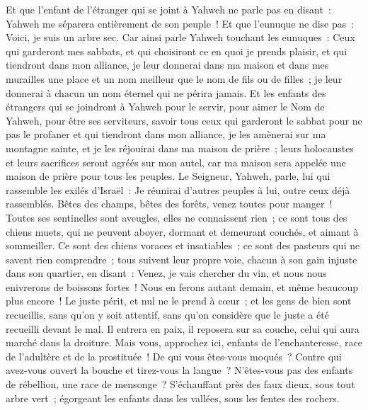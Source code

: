 \begin{multicols}{2}
Et que l'enfant de l'étranger qui se joint à Yahweh ne parle pas en disant~: Yahweh me séparera entièrement de son peuple~! Et que l'eunuque ne dise pas~: Voici, je suis un arbre sec.
Car ainsi parle Yahweh touchant les eunuques~: Ceux qui garderont mes sabbats, et qui choisiront ce en quoi je prends plaisir, et qui tiendront dans mon alliance,
je leur donnerai dans ma maison et dans mes murailles une place et un nom meilleur que le nom de fils ou de filles~; je leur donnerai à chacun un nom éternel qui ne périra jamais.
Et les enfants des étrangers qui se joindront à Yahweh pour le servir, pour aimer le Nom de Yahweh, pour être ses serviteurs, savoir tous ceux qui garderont le sabbat pour ne pas le profaner et qui tiendront dans mon alliance,
je les amènerai sur ma montagne sainte, et je les réjouirai dans ma maison de prière~; leurs holocaustes et leurs sacrifices seront agréés sur mon autel, car ma maison sera appelée une maison de prière pour tous les peuples.
Le Seigneur, Yahweh, parle, lui qui rassemble les exilés d'Israël~: Je réunirai d'autres peuples à lui, outre ceux déjà rassemblés.
Bêtes des champs, bêtes des forêts, venez toutes pour manger~!
Toutes ses sentinelles sont aveugles, elles ne connaissent rien~; ce sont tous des chiens muets, qui ne peuvent aboyer, dormant et demeurant couchés, et aimant à sommeiller.
Ce sont des chiens voraces et insatiables~; ce sont des pasteurs qui ne savent rien comprendre~; tous suivent leur propre voie, chacun à son gain injuste dans son quartier, en disant~:
Venez, je vais chercher du vin, et nous nous enivrerons de boissons fortes~! Nous en ferons autant demain, et même beaucoup plus encore~!
\VerseOne{}Le juste périt, et nul ne le prend à cœur~; et les gens de bien sont recueillis, sans qu'on y soit attentif, sans qu'on considère que le juste a été recueilli devant le mal.
Il entrera en paix, il reposera sur sa couche, celui qui aura marché dans la droiture.
Mais vous, approchez ici, enfants de l'enchanteresse, race de l'adultère et de la prostituée~!
De qui vous êtes-vous moqués~? Contre qui avez-vous ouvert la bouche et tirez-vous la langue~? N'êtes-vous pas des enfants de rébellion, une race de mensonge~?
S'échauffant près des faux dieux, sous tout arbre vert~; égorgeant les enfants dans les vallées, sous les fentes des rochers.

\end{multicols}
